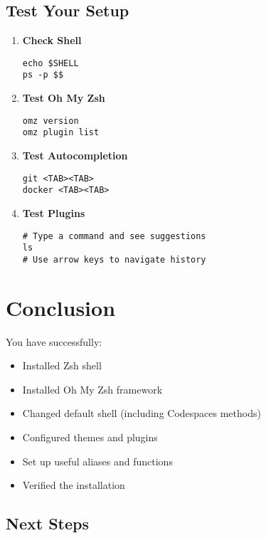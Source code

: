 \documentclass{article}
\begin{document}
\subsection{Test Your Setup}

\begin{enumerate}
    \item \textbf{Check Shell}
    \begin{verbatim}
echo $SHELL
ps -p $$
    \end{verbatim}
    
    \item \textbf{Test Oh My Zsh}
    \begin{verbatim}
omz version
omz plugin list
    \end{verbatim}
    
    \item \textbf{Test Autocompletion}
    \begin{verbatim}
git <TAB><TAB>
docker <TAB><TAB>
    \end{verbatim}
    
    \item \textbf{Test Plugins}
    \begin{verbatim}
# Type a command and see suggestions
ls
# Use arrow keys to navigate history
    \end{verbatim}
\end{enumerate}

\section{Conclusion}

You have successfully:

\begin{successbox}
\begin{itemize}
    \item Installed Zsh shell
    \item Installed Oh My Zsh framework
    \item Changed default shell (including Codespaces methods)
    \item Configured themes and plugins
    \item Set up useful aliases and functions
    \item Verified the installation
\end{itemize}
\end{successbox}

\subsection{Next Steps}
\end{document}
